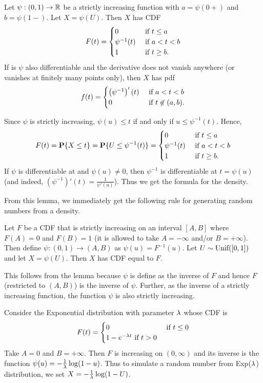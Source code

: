 \documentclass[preprint,  11pt]{amsart}
\begin{document}
\begin{lemma} Let $\psi:(0,1)\rightarrow \mathbb{R}$ be a  strictly increasing function with $a=\psi(0+)$ and $b=\psi(1-)$. Let $X=\psi(U)$. Then $X$ has CDF
$$
F(t)=\begin{cases} 0 & \mbox{ if }t\le a \\ \psi^{-1}(t) & \mbox{ if }a<t<b \\ 1 & \mbox{ if }t\ge b. \end{cases}
$$
If is $\psi$  also differentiable and the derivative does not vanish anywhere (or vanishes at finitely many points only), then $X$ has pdf
$$
f(t)=\begin{cases} \left(\psi^{-1}\right)'(t) & \mbox{ if }a<t<b\\ 0 & \mbox{ if }t\not\in (a,b). \end{cases}
$$
\end{lemma}
\bprf Since $\psi$ is strictly increasing, $\psi(u)\le t$ if and only if $u\le \psi^{-1}(t)$. Hence,
$$
F(t)=\mathbf{P}\{X\le t\} = \mathbf{P}\{U\le \psi^{-1}(t)\} = \begin{cases} 0 & \mbox{ if }t\le a \\ \psi^{-1}(t) & \mbox{ if }a<t<b \\ 1 & \mbox{ if }t\ge b. \end{cases}
$$
If $\psi$ is differentiable at and $\psi(u)\not=0$, then $\psi^{-1}$ is differentiable at $t=\psi(u)$ (and indeed, $(\psi^{-1})'(t)=\frac{1}{\psi'(u)}$). Thus we get the formula for the density.
\eprf

From this lemma, we immediately get the following rule for generating random numbers from a density.

 Let $F$ be a CDF that is strictly increasing on an interval $[A,B]$ where $F(A)=0$ and $F(B)=1$ (it is allowed to take $A=-\infty$ and/or $B=+\infty$). Then define $\psi:(0,1)\to (A,B)$ as $\psi(u)=F^{-1}(u)$. Let $U\sim \mbox{Unif}([0,1])$ and let $X=\psi(U)$. Then $X$ has CDF equal to $F$.

This follows from the lemma because $\psi$ is define as the inverse of $F$ and hence $F$ (restricted to $(A,B)$) is the inverse of $\psi$. Further, as the inverse of a strictly increasing function, the function $\psi$  is also strictly increasing.

\beg Consider the Exponential distribution with parameter $\lambda$ whose CDF is
$$
F(t)=\begin{cases} 0 & \mbox{ if }t\le 0 \\ 1-e^{-\lambda t} \mbox{ if }t>0 \end{cases}
$$ Take $A=0$ and $B=+\infty$. Then $F$ is increasing on $(0,\infty)$ and its inverse is the function $\psi(u)=-\frac{1}{\lambda}\log(1-u)$. Thus to simulate a random number from Exp($\lambda$) distribution, we set $X=-\frac{1}{\lambda}\log(1-U)$.
\eeg
\end{document}

